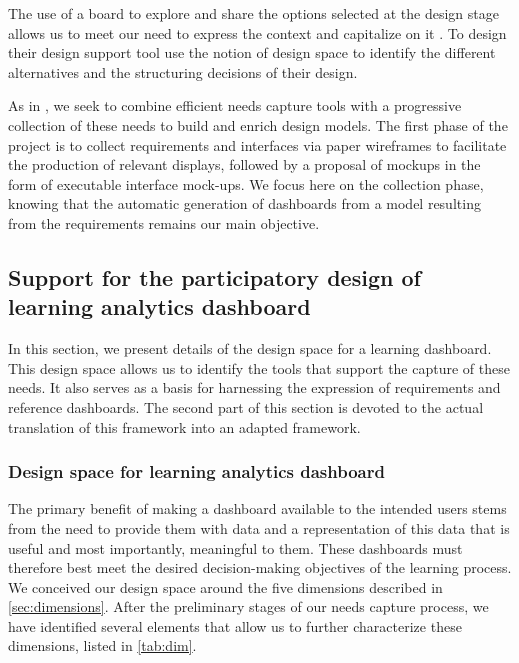 \documentclass[manuscript,nonacm,12pt]{acmart}
\begin{document}
The use of a board to explore and share the options selected at the design stage allows us to meet our need to express the context and capitalize on it \cite{osterwalder2010business}. To design their design support tool \citet{hallifax2018design} use the notion of design space \cite{shaw2011role} to identify the different alternatives and the structuring decisions of their design. 

As in \cite{rivero2014mockup}, we seek to combine efficient needs capture tools with a progressive collection of these needs to build and enrich design models. The first phase of the project is to collect requirements and interfaces via paper wireframes to facilitate the production of relevant displays, followed by a proposal of mockups in the form of executable interface mock-ups. We focus here on the collection phase, knowing that the automatic generation of dashboards from a model resulting from the requirements remains our main objective.

\subsection{Support for the participatory design of learning analytics dashboard}
In this section, we present details of the design space for a learning dashboard. This design space allows us to identify the tools that support the capture of these needs. It also serves as a basis for harnessing the expression of requirements and reference dashboards. The second part of this section is devoted to the actual translation of this framework into an adapted framework.
\subsubsection{Design space for learning analytics dashboard}
The primary benefit of making a dashboard available to the intended users stems from the need to provide them with data and a representation of this data that is useful and most importantly, meaningful to them. These dashboards must therefore best meet the desired decision-making objectives of the learning process. We conceived our design space around the five dimensions described in \ref{sec:dimensions}. After the preliminary stages of our needs capture process, we have identified several elements that allow us to further characterize these dimensions, listed in \ref{tab:dim}.
\end{document}
